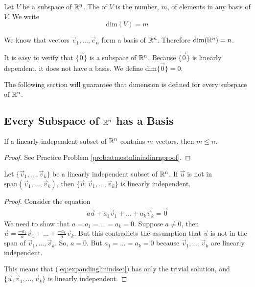 \documentclass{ximera}
\begin{document}
\begin{definition}\label{def:dimension}
Let $V$ be a subspace of $\mathbb{R}^n$.  The  of $V$ is the number, $m$, of elements in any basis of $V$.  We write
$$\mbox{dim}(V)=m$$
\end{definition}

\begin{example}\label{ex:basisofrn}
We know that vectors $\vec{e}_1, \ldots ,\vec{e}_n$ form a basis of $\mathbb{R}^n$.  Therefore $\mbox{dim}(\mathbb{R}^n)=n$.
\end{example}

\begin{remark}
    It is easy to verify that $\{\vec{0}\}$ is a subspace of $\mathbb{R}^n$.  Because $\{\vec{0}\}$ is linearly dependent, it does not have a basis.  We define $\text{dim}\{\vec{0}\}=0$. 
\end{remark}

The following section will guarantee that dimension is defined for every subspace of $\mathbb{R}^n$.

\subsection*{Every Subspace of $\mathbb{R}^n$ has a Basis}

\begin{lemma}\label{lemma:atmostnlinindinrn}
If a linearly independent subset of $\mathbb{R}^n$ contains $m$ vectors, then $m\leq n$.
\end{lemma}
\begin{proof}
See Practice Problem \ref{prob:atmostnlinindinrnproof}.
\end{proof}

\begin{lemma}\label{lemma:expandinglinindset}
Let $\{\vec{v}_1,\ldots ,\vec{v}_k\}$ be a linearly independent subset of $\mathbb{R}^n$.  If $\vec{u}$ is not in $\mbox{span}(\vec{v}_1,\ldots ,\vec{v}_k)$, then $\{\vec{u},\vec{v}_1,\ldots ,\vec{v}_k\}$ is linearly independent.
\end{lemma}
\begin{proof}
Consider the equation
\begin{align}\label{eq:expandinglinindset}a\vec{u}+a_1\vec{v}_1+\ldots +a_k\vec{v}_k=\vec{0}\end{align}
We need to show that $a=a_1=\ldots =a_k=0$.  Suppose $a\neq 0$, then $\vec{u}=\frac{-a_1}{a}\vec{v}_1+\ldots +\frac{-a_k}{a}\vec{v}_k$.  But this contradicts the assumption that $\vec{u}$ is not in the span of $\vec{v}_1,\ldots ,\vec{v}_k$.  So, $a=0$.  But $a_1=\ldots =a_k=0$ because $\vec{v}_1,\ldots ,\vec{v}_k$ are linearly independent.

This means that (\ref{eq:expandinglinindset}) has only the trivial solution, and $\{\vec{u},\vec{v}_1,\ldots ,\vec{v}_k\}$ is linearly independent.
\end{proof}
\end{document}
